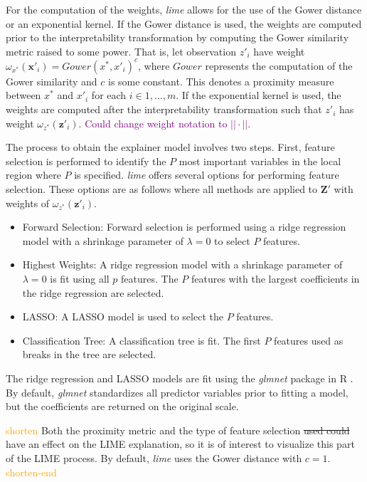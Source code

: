\documentclass[AMS,STIX2COL]{WileyNJD-v2}\usepackage[]{graphicx}\usepackage[]{color}
\newcommand{\hh}[1]{\textcolor{orange}{#1}}
\newcommand{\kgc}[1]{\textcolor{purple}{#1}}
\begin{document}
{For the computation of the weights, \emph{lime} allows for the use of the Gower distance \citep{gower:1971} or an exponential kernel. If the Gower distance is used, the weights are computed prior to the interpretability transformation by computing the Gower similarity metric raised to some power. That is, let observation $z'_i$ have weight $\omega_{x^*}(\textbf{x}'_i) = Gower(x^*, x'_i)^c$, where $Gower$ represents the computation of the Gower similarity and $c$ is some constant. This denotes a proximity measure between $x^*$ and $x'_i$ for each $i\in 1,...,m$. If the exponential kernel is used, the weights are computed after the interpretability transformation such that $z'_i$ has weight $\omega_{z^*}(\textbf{z}'_i)$. \kgc{Could change weight notation to $|| \cdot ||$.}

The process to obtain the explainer model involves two steps. First, feature selection is performed to identify the $P$ most important variables in the local region where $P$ is specified. \emph{lime} offers several options for performing feature selection. These options are as follows where all methods are applied to $\textbf{Z}'$ with weights of $\omega_{z^*}(\textbf{z}'_i)$.
\begin{itemize}
\item Forward Selection: Forward selection is performed using a ridge regression model with a shrinkage parameter of $\lambda=0$ to select $P$ features.
\item Highest Weights: A ridge regression model with a shrinkage parameter of $\lambda=0$ is fit using all $p$ features. The $P$ features with the largest coefficients in the ridge regression are selected.
\item LASSO: A LASSO model is used to select the $P$ features.
\item Classification Tree: A classification tree is fit. The first $P$ features used as breaks in the tree are selected.
\end{itemize}
The ridge regression and LASSO models are fit using the \emph{glmnet} package in R \citep{simon:2011}. By default, \emph{glmnet} standardizes all predictor variables prior to fitting a model, but the coefficients are returned on the original scale.

\hh{shorten}
Both the proximity metric and the type of feature selection \sout{used could} have an effect on the LIME explanation, so it is of interest to visualize this part of the LIME process. By default, \emph{lime} uses the Gower distance with $c=1$.
\hh{shorten-end}

}
\end{document}
